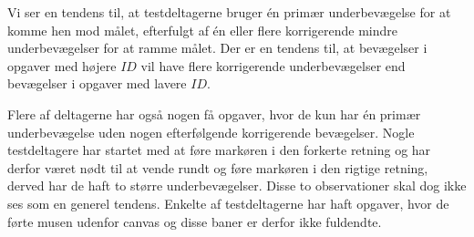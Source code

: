 Vi ser en tendens til, at testdeltagerne bruger én primær underbevægelse for at komme hen mod målet, efterfulgt af én eller flere korrigerende mindre underbevægelser for at ramme målet. Der er en tendens til, at bevægelser i opgaver med højere $ID$ vil have flere korrigerende underbevægelser end bevægelser i opgaver med lavere $ID$. 

Flere af deltagerne har også nogen få opgaver, hvor de kun har én primær underbevægelse uden nogen efterfølgende korrigerende bevægelser. Nogle testdeltagere har startet med at føre markøren i den forkerte retning og har derfor været nødt til at vende rundt og føre markøren i den rigtige retning, derved har de haft to større underbevægelser. Disse to observationer skal dog ikke ses som en generel tendens. Enkelte af testdeltagerne har haft opgaver, hvor de førte musen udenfor canvas og disse baner er derfor ikke fuldendte.

